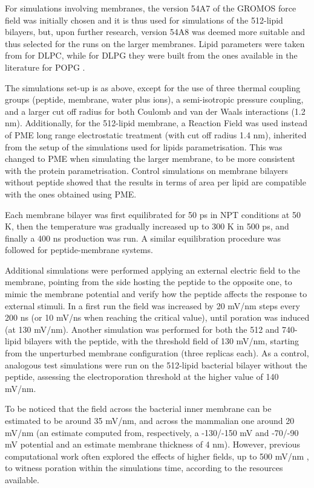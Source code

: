 For simulations involving membranes, the version 54A7 of the GROMOS force field \citep{Schmid2011} was initially chosen and it is thus used for simulations of the 512-lipid bilayers, but, upon further research, version 54A8 \citep{Oostenbrink2005, Reif2013} was deemed more suitable and thus selected for the runs on the larger membranes. Lipid parameters were taken from \citep{PogerOrig} for DLPC, while for DLPG they were built from the ones available in the literature for POPG \citep{Kukol2009}.

The simulations set-up is as above, except for the use of three thermal coupling groups (peptide, membrane, water plus ions), a semi-isotropic pressure coupling, and a larger cut off radius for both Coulomb and van der Waals interactions (1.2 nm). Additionally, for the 512-lipid membrane, a Reaction Field \citep{Tironi1995} was used instead of PME long range electrostatic treatment (with cut off radius 1.4 nm), inherited from the setup of the simulations used for lipids parametrisation. This was changed to PME when simulating the larger membrane, to be more consistent with the protein parametrisation. Control simulations on membrane bilayers without peptide showed that the results in terms of area per lipid are compatible with the ones obtained using PME.

Each membrane bilayer was first equilibrated for 50 ps in NPT conditions at 50 K, then the temperature was gradually increased up to 300 K in 500 ps, and finally a 400 ns production was run. A similar equilibration procedure was followed for peptide-membrane systems.

Additional simulations were performed applying an external electric field to the membrane, pointing from the side hosting the peptide to the opposite one, to mimic the membrane potential and verify how the peptide affects the response to external stimuli.
%
In a first run the field was increased by 20 mV/nm steps every 200 ns (or 10 mV/ns when reaching the critical value), until poration was induced (at 130 mV/nm).
%
Another simulation was performed for both the 512 and 740-lipid bilayers with the peptide, with the threshold field of 130 mV/nm, starting from the unperturbed membrane configuration (three replicas each).
%
As a control, analogous test simulations were run on the 512-lipid bacterial bilayer without the peptide, assessing the electroporation threshold at the higher value of 140 mV/nm.

To be noticed that the field across the bacterial inner membrane can be estimated to be around 35 mV/nm, and across the mammalian one around 20 mV/nm (an estimate computed from, respectively, a -130/-150 mV and -70/-90 mV potential \citep{Yeaman2003,Wilson2011} and an estimate membrane thickness of 4 nm). However, previous computational work often explored the effects of higher fields, up to 500 mV/nm \citep{Tieleman2004, Bockmann2008, Piggot2011}, to witness poration within the simulations time, according to the resources available.

